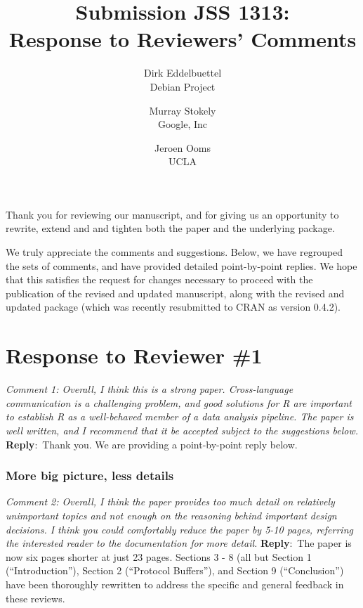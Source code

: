 \documentclass[10pt]{article}
\newcommand{\pointRaised}[2]{\smallskip %
  \textsl{{\fontseries{b}\selectfont #1}: #2}\newline}
\newcommand{\reply}[1]{\textbf{Reply}:\ #1 \smallskip } %
\begin{document}
\author{Dirk Eddelbuettel\\Debian Project \and 
        Murray Stokely\\Google, Inc \and
        Jeroen Ooms\\UCLA}
\title{Submission JSS 1313: \\ Response to Reviewers' Comments}
\maketitle 
\thispagestyle{empty}

Thank you for reviewing our manuscript, and for giving us an opportunity to
rewrite, extend and and tighten both the paper and the underlying package.

\smallskip
We truly appreciate the comments and suggestions. Below, we have regrouped the sets
of comments, and have provided detailed point-by-point replies.
%
We hope that this satisfies the request for changes necessary to proceed with
the publication of the revised and updated manuscript, along with the revised
and updated package (which was recently resubmitted to CRAN as version 0.4.2).

\section*{Response to Reviewer \#1}

\pointRaised{Comment 1}{Overall, I think this is a strong paper. Cross-language communication
  is a challenging problem, and good solutions for R are important to
  establish R as a well-behaved member of a data analysis pipeline. The
  paper is well written, and I recommend that it be accepted subject to
  the suggestions below.}
\reply{Thank you. We are providing a point-by-point reply below.}

\subsubsection*{More big picture, less details}

\pointRaised{Comment 2}{Overall, I think the paper provides too much detail on
  relatively unimportant topics and not enough on the reasoning behind
  important design decisions. I think you could comfortably reduce the paper
  by 5-10 pages, referring the interested reader to the documentation for
  more detail.}
\reply{The paper is now six pages shorter at just 23 pages.
  Sections 3 - 8 (all but Section 1 (``Introduction''), Section 2 (``Protocol Buffers''),
  and Section 9 (``Conclusion'') have been thoroughly rewritten to address the specific and
  general feedback in these reviews.}
\end{document}

